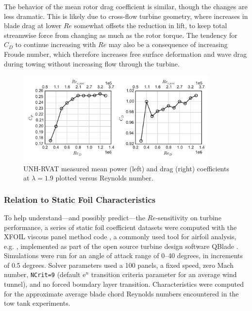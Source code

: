 \documentclass[energies,article,accept,moreauthors,pdftex,12pt,a4paper]{mdpi}
\begin{document}
The behavior of the mean rotor drag coefficient is similar, though the changes
are less dramatic. This is likely due to cross-flow turbine geometry, where
increases in blade drag at lower $Re$ somewhat offsets the reduction in lift, to
keep total streamwise force from changing as much as the rotor torque. The
tendency for $C_D$ to continue increasing with $Re$ may also be a consequence of
increasing Froude number, which therefore increases free surface deformation and
wave drag during towing without increasing flow through the turbine.

\begin{figure}[ht]
\centering

\includegraphics[width=0.9\textwidth]{figures/perf_re_dep}

\caption{UNH-RVAT measured mean power (left) and drag (right) coefficients at
    $\lambda=1.9$ plotted versus Reynolds number.}

\label{fig:perf-Re-dep}
\end{figure}


\subsubsection{Relation to Static Foil Characteristics}

To help understand---and possibly predict---the $Re$-sensitivity on turbine
performance, a series of static foil coefficient datasets were computed with the
XFOIL viscous panel method code \cite{Drela1989}, a commonly used tool for
airfoil analysis, e.g. \cite{Castelli2011, Walker2014}, implemented as part of
the open source turbine design software QBlade \cite{Marten2013}. Simulations
were run for an angle of attack range of 0--40 degrees, in increments of 0.5
degrees. Solver parameters used a 100 panels, a fixed speed, zero Mach number,
\texttt{NCrit=9} (default $\mathrm{e}^n$ transition criteria parameter for an
average wind tunnel), and no forced boundary layer transition. Characteristics
were computed for the approximate average blade chord Reynolds numbers
encountered in the tow tank experiments.
\end{document}

